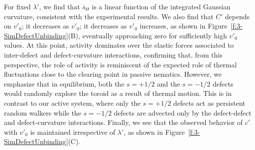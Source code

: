 For fixed $\lambda'$, we find that $\overbar{s}_{\Theta}$ is a linear function of the integrated Gaussian curvature, consistent with the experimental results.
We also find that $C'$ depends on $v'_0$; it decreases as $v'_0$; it decreases as $v'_0$ increases, as shown in Figure~\ref{f:3-SimDefectUnbinding}(B), eventually approaching zero for sufficiently high $v'_0$ values.
At this point, activity dominates over the elastic forces associated to inter-defect and defect-curvature interactions, confirming that, from this perspective, the role of activity is reminiscent of the expected role of thermal fluctuations close to the clearing point in passive nematics.
However, we emphasize that in equilibrium, both the $s = +1/2$ and the $s = -1/2$ defects would randomly explore the toroid as a result of thermal motion.
This is in contrast to our active system, where only the $s = +1/2$ defects act as persistent random walkers while the $s = -1/2$ defects are advected only by the defect-defect and defect-curvature interactions.
Finally, we see that the observed behavior of $c'$ with $v'_0$ is maintained irrespective of $\lambda'$, as shown in Figure~\ref{f:3-SimDefectUnbinding}(C).


